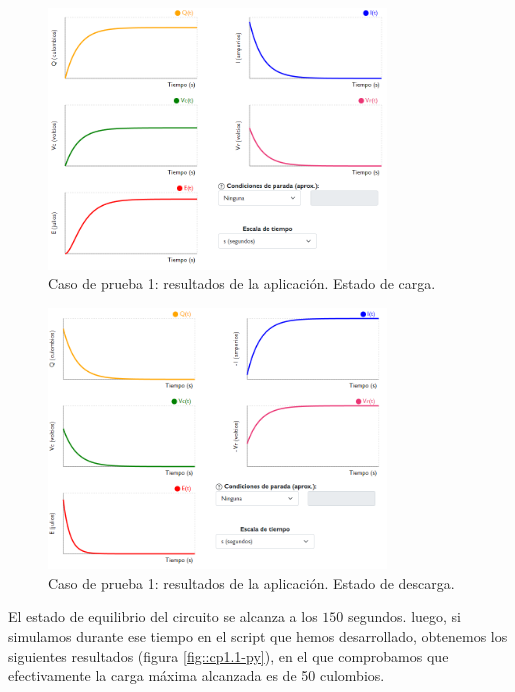 \documentclass[../main.tex]{subfiles}
\begin{document}
\begin{figure}[!h]
    \centering
    \includegraphics[width=0.8\textwidth]{images/cp1-app.PNG}
    \caption{Caso de prueba 1: resultados de la aplicación. Estado de carga.}
    \label{fig::cp1-app}
\end{figure}

\begin{figure}[!h]
    \centering
    \includegraphics[width=0.8\textwidth]{images/cp1.1-app.PNG}
    \caption{Caso de prueba 1: resultados de la aplicación. Estado de descarga.}
    \label{fig::cp1.1-app}
\end{figure}


El estado de equilibrio del circuito se alcanza a los $150$ segundos. luego, si simulamos durante ese tiempo en el script que hemos desarrollado, obtenemos los siguientes resultados (figura \ref{fig::cp1.1-py}), en el que comprobamos que efectivamente la carga máxima alcanzada es de 50 culombios.\\
\end{document}
